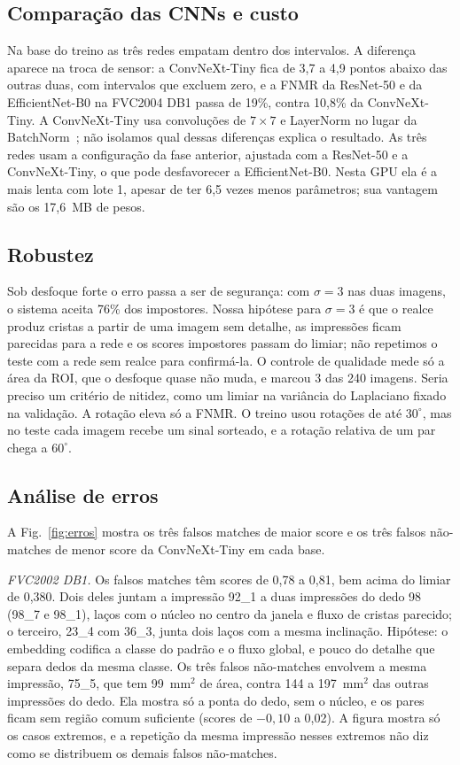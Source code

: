 \documentclass[conference]{IEEEtran}
\begin{document}
\subsection{Comparação das CNNs e custo}

Na base do treino as três redes empatam dentro dos intervalos. A diferença aparece na troca de sensor: a ConvNeXt-Tiny fica de 3,7 a 4,9 pontos abaixo das outras duas, com intervalos que excluem zero, e a FNMR da ResNet-50 e da EfficientNet-B0 na FVC2004 DB1 passa de 19\%, contra 10,8\% da ConvNeXt-Tiny. A ConvNeXt-Tiny usa convoluções de $7\times7$ e LayerNorm no lugar da BatchNorm~\cite{liu2022convnext}; não isolamos qual dessas diferenças explica o resultado. As três redes usam a configuração da fase anterior, ajustada com a ResNet-50 e a ConvNeXt-Tiny, o que pode desfavorecer a EfficientNet-B0. Nesta GPU ela é a mais lenta com lote 1, apesar de ter 6,5 vezes menos parâmetros; sua vantagem são os 17,6~MB de pesos.

\subsection{Robustez}

Sob desfoque forte o erro passa a ser de segurança: com $\sigma=3$ nas duas imagens, o sistema aceita 76\% dos impostores. Nossa hipótese para $\sigma=3$ é que o realce produz cristas a partir de uma imagem sem detalhe, as impressões ficam parecidas para a rede e os scores impostores passam do limiar; não repetimos o teste com a rede sem realce para confirmá-la. O controle de qualidade mede só a área da ROI, que o desfoque quase não muda, e marcou 3 das 240 imagens. Seria preciso um critério de nitidez, como um limiar na variância do Laplaciano fixado na validação. A rotação eleva só a FNMR. O treino usou rotações de até $30^\circ$, mas no teste cada imagem recebe um sinal sorteado, e a rotação relativa de um par chega a $60^\circ$.

\subsection{Análise de erros}

A Fig.~\ref{fig:erros} mostra os três falsos matches de maior score e os três falsos não-matches de menor score da ConvNeXt-Tiny em cada base.

\emph{FVC2002 DB1.} Os falsos matches têm scores de 0,78 a 0,81, bem acima do limiar de 0,380. Dois deles juntam a impressão 92\_1 a duas impressões do dedo 98 (98\_7 e 98\_1), laços com o núcleo no centro da janela e fluxo de cristas parecido; o terceiro, 23\_4 com 36\_3, junta dois laços com a mesma inclinação. Hipótese: o embedding codifica a classe do padrão e o fluxo global, e pouco do detalhe que separa dedos da mesma classe. Os três falsos não-matches envolvem a mesma impressão, 75\_5, que tem 99~mm$^2$ de área, contra 144 a 197~mm$^2$ das outras impressões do dedo. Ela mostra só a ponta do dedo, sem o núcleo, e os pares ficam sem região comum suficiente (scores de $-0{,}10$ a 0,02). A figura mostra só os casos extremos, e a repetição da mesma impressão nesses extremos não diz como se distribuem os demais falsos não-matches.
\end{document}

